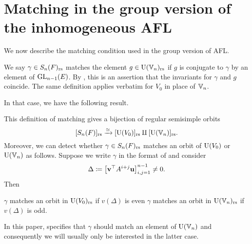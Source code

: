\section{Matching in the group version of the inhomogeneous AFL}
We now describe the matching condition used in the group version of AFL.
\begin{definition}
  We say $\gamma \in S_n(F)_{\mathrm{rs}}$ matches the element $g \in \operatorname{U}(\mathbb V_n)_{\mathrm{rs}}$
  if $g$ is conjugate to $\gamma$ by an element of $\operatorname{GL}_{n-1}(E)$.
  By , this is an assertion that
  the invariants for $\gamma$ and $g$ coincide.
  The same definition applies verbatim for $V_0$ in place of $\mathbb V_n$.
  \label{def:matching_inhomog}
\end{definition}
In that case, we have the following result.
\begin{proposition}
  \label{prop:valuation_delta_matching_group}
  This definition of matching gives
  a bijection of regular semisimple orbits
  \[ [S_n(F)]_{\mathrm{rs}} \xrightarrow{\simeq} [\operatorname{U}(V_0)]_{\mathrm{rs}} \amalg [\operatorname{U}(\mathbb V_n)]_{\mathrm{rs}}. \]
  Moreover, we can detect whether $\gamma \in S_n(F)_{\mathrm{rs}}$ matches an orbit of
  $\operatorname{U}(V_0)$ or $\operatorname{U}(\mathbb V_n)$ as follows.
  Suppose we write $\gamma$ in the format of  and consider
  \[ \Delta \coloneqq \left[ \mathbf v^\top A^{i+j} \mathbf u \right]_{i,j=1}^{n-1} \neq 0. \]
  Then
  \begin{itemize}
    \ii $\gamma$ matches an orbit in $\operatorname{U}(V_0)_{\mathrm{rs}}$ if $v(\Delta)$ is even
    \ii $\gamma$ matches an orbit in $\operatorname{U}(\mathbb V_n)_{\mathrm{rs}}$ if $v(\Delta)$ is odd.
  \end{itemize}
\end{proposition}
In this paper, 
specifies that $\gamma$ should match an element of $\operatorname{U}(\mathbb V_n)$
and consequently we will usually only be interested in the latter case.

